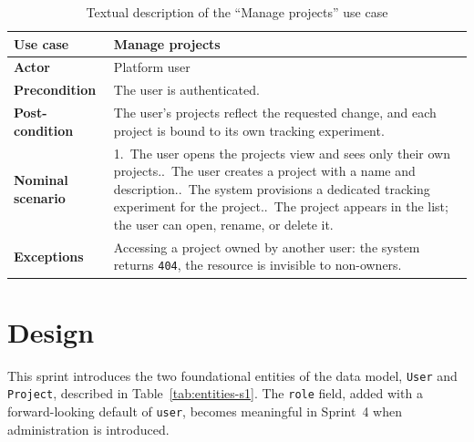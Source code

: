 \begin{table}[H]\centering
\renewcommand{\arraystretch}{1.3}
\caption{Textual description of the ``Manage projects'' use case}\label{tab:uc-projects}
\begin{tabularx}{\textwidth}{|>{\bfseries}p{3.2cm}|X|}
\hline
Use case & Manage projects\\ \hline
Actor & Platform user\\ \hline
Precondition & The user is authenticated.\\ \hline
Post-condition & The user's projects reflect the requested change, and each project is bound to its own tracking experiment.\\ \hline
Nominal scenario & 1.~The user opens the projects view and sees only their own projects.\newline 2.~The user creates a project with a name and description.\newline 3.~The system provisions a dedicated tracking experiment for the project.\newline 4.~The project appears in the list; the user can open, rename, or delete it.\\ \hline
Exceptions & Accessing a project owned by another user: the system returns \texttt{404}, the resource is invisible to non-owners.\\ \hline
\end{tabularx}
\end{table}

\section{Design}
This sprint introduces the two foundational entities of the data model,
\texttt{User} and \texttt{Project}, described in Table~\ref{tab:entities-s1}. The
\texttt{role} field, added with a forward-looking default of \texttt{user},
becomes meaningful in Sprint~4 when administration is introduced.

